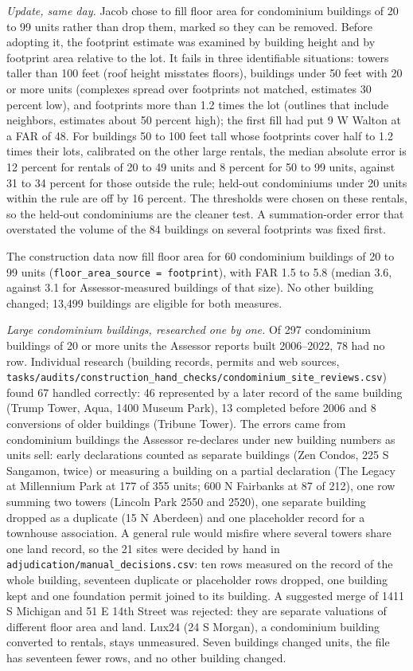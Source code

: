 \textit{Update, same day.} Jacob chose to fill floor area for condominium buildings of 20 to 99 units rather than
drop them, marked so they can be removed. Before adopting it, the footprint estimate was examined by building height
and by footprint area relative to the lot. It fails in three identifiable situations: towers taller than 100 feet
(roof height misstates floors), buildings under 50 feet with 20 or more units (complexes spread over footprints not
matched, estimates 30 percent low), and footprints more than 1.2 times the lot (outlines that include neighbors,
estimates about 50 percent high); the first fill had put 9 W Walton at a FAR of 48. For buildings 50 to 100 feet tall
whose footprints cover half to 1.2 times their lots, calibrated on the other large rentals, the median absolute error
is 12 percent for rentals of 20 to 49 units and 8 percent for 50 to 99 units, against 31 to 34 percent for those
outside the rule; held-out condominiums under 20 units within the rule are off by 16 percent. The thresholds were
chosen on these rentals, so the held-out condominiums are the cleaner test. A summation-order error that overstated
the volume of the 84 buildings on several footprints was fixed first.

The construction data now fill floor area for 60 condominium buildings of 20 to 99 units
(\texttt{floor\_area\_source = footprint}), with FAR 1.5 to 5.8 (median 3.6, against 3.1 for Assessor-measured
buildings of that size). No other building changed; 13,499 buildings are eligible for both measures.

\textit{Large condominium buildings, researched one by one.} Of 297 condominium buildings of 20 or more units the
Assessor reports built 2006--2022, 78 had no row. Individual research (building records, permits and web sources,
\texttt{tasks/audits/construction\_hand\_checks/condominium\_site\_reviews.csv}) found 67 handled correctly: 46
represented by a later record of the same building (Trump Tower, Aqua, 1400 Museum Park), 13 completed before 2006
and 8 conversions of older buildings (Tribune Tower). The errors came from condominium buildings the Assessor
re-declares under new building numbers as units sell: early declarations counted as separate buildings (Zen Condos,
225 S Sangamon, twice) or measuring a building on a partial declaration (The Legacy at Millennium Park at 177 of 355
units; 600 N Fairbanks at 87 of 212), one row summing two towers (Lincoln Park 2550 and 2520), one separate building
dropped as a duplicate (15 N Aberdeen) and one placeholder record for a townhouse association. A general rule would
misfire where several towers share one land record, so the 21 sites were decided by hand in
\texttt{adjudication/manual\_decisions.csv}: ten rows measured on the record of the whole building, seventeen
duplicate or placeholder rows dropped, one building kept and one foundation permit joined to its building. A
suggested merge of 1411 S Michigan and 51 E 14th Street was rejected: they are separate valuations of different floor
area and land. Lux24 (24 S Morgan), a condominium building converted to rentals, stays unmeasured. Seven buildings
changed units, the file has seventeen fewer rows, and no other building changed.
